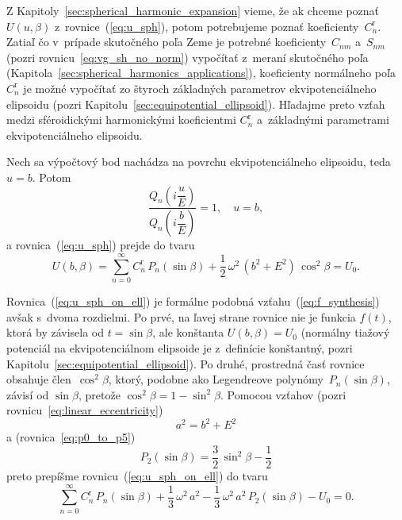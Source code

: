 \documentclass[a4paper, 12pt]{book}
\begin{document}
Z Kapitoly~\ref{sec:spherical_harmonic_expansion} vieme, že ak chceme poznať 
$U(u,\beta)$ z~rovnice~(\ref{eq:u_sph}), potom potrebujeme poznať 
koeficienty~$C_n^\mathrm{r}$.  Zatiaľ čo v~prípade skutočného poľa Zeme je 
potrebné koeficienty~$C_{nm}$ a~$S_{nm}$ (pozri rovnicu~\ref{eq:vg_sh_no_norm}) 
vypočítať z~meraní skutočného poľa 
(Kapitola~\ref{sec:spherical_harmonics_applications}), koeficienty normálneho 
poľa $C_n^\mathrm{r}$ je možné vypočítať zo štyroch základných parametrov 
ekvipotenciálneho elipsoidu (pozri Kapitolu~\ref{sec:equipotential_ellipsoid}).  
Hľadajme preto vzťah medzi sféroidickými harmonickými koeficientmi 
$C_n^\mathrm{r}$ a~základnými parametrami ekvipotenciálneho elipsoidu.

Nech sa výpočtový bod nachádza na povrchu ekvipotenciálneho elipsoidu, teda $u 
= b$.  Potom
%
\begin{equation}
\frac{Q_n\left( i \dfrac{u}{E} \right)}{Q_n\left( i \dfrac{b}{E} \right)} 
= 1{,} \quad u = b{,}
\end{equation}
%
a rovnica~(\ref{eq:u_sph}) prejde do tvaru
%
\begin{equation}
\label{eq:u_sph_on_ell}
U(b, \beta) = \sum_{n = 0}^\infty C^{\mathrm{r}}_n \, P_n(\sin\beta) 
+ \frac{1}{2} \, \omega^2 \, (b^2 + E^2) \, \cos^2\beta = U_0{.}
\end{equation}

Rovnica~(\ref{eq:u_sph_on_ell}) je formálne podobná 
vzťahu~(\ref{eq:f_synthesis}) avšak s~dvoma rozdielmi.  Po prvé, na ľavej 
strane rovnice nie je funkcia $f(t)$, ktorá by závisela od $t = \sin\beta$, ale 
konštanta $U(b, \beta) = U_0$ (normálny tiažový potenciál na ekvipotenciálnom 
elipsoide je z~definície konštantný, pozri 
Kapitolu~\ref{sec:equipotential_ellipsoid}).  Po druhé, prostredná časť rovnice 
obsahuje člen~$\cos^2\beta$, ktorý, podobne ako Legendreove 
polynómy~$P_n(\sin\beta)$, závisí od $\sin\beta$, pretože $\cos^2\beta 
= 1 - \sin^2\beta$.  Pomocou vzťahov (pozri 
rovnicu~\ref{eq:linear_eccentricity})
%
\begin{equation}
a^2 = b^2 + E^2
\end{equation}
%
a (rovnica~\ref{eq:p0_to_p5})
%
\begin{equation}
P_2(\sin\beta) = \frac{3}{2} \, \sin^2\beta - \frac{1}{2}
\end{equation}
%
preto prepíšme rovnicu~(\ref{eq:u_sph_on_ell}) do tvaru
%
\begin{equation}
\label{eq:cnr}
\sum_{n = 0}^\infty C^{\mathrm{r}}_n \, P_n(\sin\beta) + \frac{1}{3} \, 
\omega^2 \, a^2  - \frac{1}{3} \, \omega^2 \, a^2 \, P_2(\sin\beta) - U_0 
= 0{.}
\end{equation}
\end{document}
